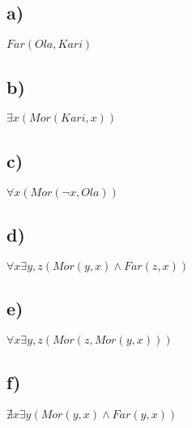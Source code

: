 \documentclass[a4paper, norsk, 10pt]{article}
\begin{document}
\begin{flushleft}
  \subsection*{a)}
  $Far(Ola, Kari)$
  \subsection*{b)}
  $\exists x(Mor(Kari, x))$
  \subsection*{c)}
  $\forall x(Mor(\neg x, Ola))$
  \subsection*{d)}
  $\forall x \exists y, z(Mor(y, x) \land Far(z, x))$
  \subsection*{e)}
  $\forall x \exists y, z (Mor(z, Mor(y, x)))$ 
  \subsection*{f)}
  $\nexists x \exists y (Mor(y, x) \land Far(y, x))$
  

\end{flushleft}
\end{document}
